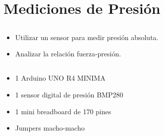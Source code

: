 \chapter{Mediciones de Presión}
\section{\obj}
\capacidad
\begin{itemize}
\item Utilizar un sensor para medir presión absoluta.
\item Analizar la relación fuerza-presión.
\end{itemize}

\section{\mat}
\begin{itemize}
\item 1 Arduino UNO R4 MINIMA
\item 1 sensor digital de presión BMP280
\item 1 mini breadboard de 170 pines
\item Jumpers macho-macho
\end{itemize}


\section{\pro}
